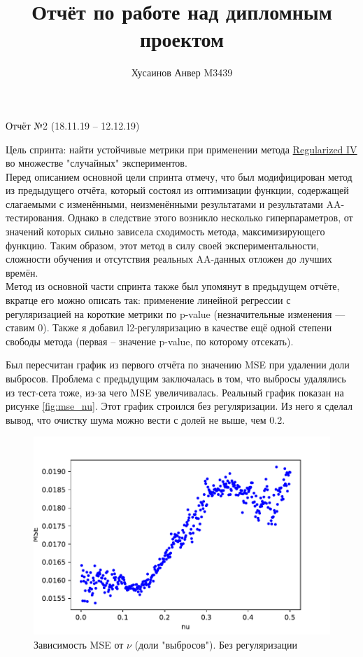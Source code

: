 \documentclass{article}
\title{Отчёт по работе над дипломным проектом}
\author{Хусаинов Анвер M3439}
\begin{document}
	\maketitle
	\begin{center}
		Отчёт №2 (18.11.19 – 12.12.19)
	\end{center}

	
	Цель спринта: найти устойчивые метрики при применении метода \href{https://arxiv.org/abs/1701.01140}{Regularized IV} во множестве "случайных" экспериментов. \\
	
	Перед описанием основной цели спринта отмечу, что был модифицирован метод из предыдущего отчёта, который состоял из оптимизации функции, содержащей слагаемыми с изменёнными, неизменёнными результатами и результатами AA-тестирования. Однако в следствие этого возникло несколько гиперпараметров, от значений которых сильно зависела сходимость метода, максимизирующего функцию. Таким образом, этот метод в силу своей экспериментальности, сложности обучения и отсутствия реальных AA-данных отложен до лучших времён. \\
	
	Метод из основной части спринта также был упомянут в предыдущем отчёте, вкратце его можно описать так: применение линейной регрессии с регуляризацией на короткие метрики по p-value (незначительные изменения --- ставим 0). Также я добавил l2-регуляризацию в качестве ещё одной степени свободы метода (первая -- значение p-value, по которому отсекать).
	
	Был пересчитан график из первого отчёта по значению MSE при удалении доли выбросов. Проблема с предыдущим заключалась в том, что выбросы удалялись из тест-сета тоже, из-за чего MSE увеличивалась. Реальный график показан на рисунке \ref{fig:mse_nu}. Этот график строился без регуляризации. Из него я сделал вывод, что очистку шума можно вести с долей не выше, чем 0.2.  \\

	\begin{figure}[h]
		\includegraphics[scale=1]{MSE_nu_dependency.pdf}
		\caption{Зависимость MSE от $\nu$ (доли "выбросов"). Без регуляризации}
		\label{fig:mse}
	\end{figure}
	
\end{document}
